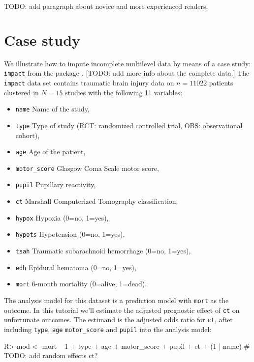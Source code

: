 \documentclass[
]{jss}
\providecommand{\tightlist}{%
  \setlength{\itemsep}{0pt}\setlength{\parskip}{0pt}}
\begin{document}
TODO: add paragraph about novice and more experienced readers.

\hypertarget{case-study}{%
\section{Case study}\label{case-study}}

We illustrate how to impute incomplete multilevel data by means of a
case study: \texttt{impact} from the  package
\citep[empirical data on traumatic brain injuries, \(n = 11,022\) units
across \(N = 15\) clusters,][]{metamisc}. {[}TODO: add more info about
the complete data.{]} The \texttt{impact} data set contains traumatic
brain injury data on \(n = 11022\) patients clustered in \(N = 15\)
studies with the following 11 variables:

\begin{itemize}
\tightlist
\item
  \texttt{name} Name of the study,
\item
  \texttt{type} Type of study (RCT: randomized controlled trial, OBS:
  observational cohort),
\item
  \texttt{age} Age of the patient,
\item
  \texttt{motor\_score} Glasgow Coma Scale motor score,
\item
  \texttt{pupil} Pupillary reactivity,
\item
  \texttt{ct} Marshall Computerized Tomography classification,
\item
  \texttt{hypox} Hypoxia (0=no, 1=yes),
\item
  \texttt{hypots} Hypotension (0=no, 1=yes),
\item
  \texttt{tsah} Traumatic subarachnoid hemorrhage (0=no, 1=yes),
\item
  \texttt{edh} Epidural hematoma (0=no, 1=yes),
\item
  \texttt{mort} 6-month mortality (0=alive, 1=dead).
\end{itemize}

The analysis model for this dataset is a prediction model with
\texttt{mort} as the outcome. In this tutorial we'll estimate the
adjusted prognostic effect of \texttt{ct} on unfortunate outcomes. The
estimand is the adjusted odds ratio for \texttt{ct}, after including
\texttt{type}, \texttt{age} \texttt{motor\_score} and \texttt{pupil}
into the analysis model:

\begin{CodeChunk}
\begin{CodeInput}
R> mod <- mort ~ 1 + type + age + motor_score + pupil + ct + (1 | name) # TODO: add random effects ct?
\end{CodeInput}
\end{CodeChunk}
\end{document}
